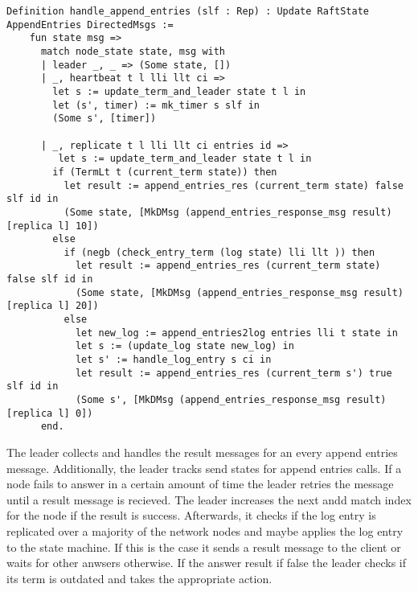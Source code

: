 \begin{lstlisting}[style=coq,label=lst:replicate,
caption=The definitions on how a node changes it node state.]
  Definition handle_append_entries (slf : Rep) : Update RaftState AppendEntries DirectedMsgs :=
    fun state msg =>
      match node_state state, msg with
      | leader _, _ => (Some state, [])
      | _, heartbeat t l lli llt ci =>
        let s := update_term_and_leader state t l in
        let (s', timer) := mk_timer s slf in
        (Some s', [timer])

      | _, replicate t l lli llt ci entries id =>
         let s := update_term_and_leader state t l in
        if (TermLt t (current_term state)) then
          let result := append_entries_res (current_term state) false slf id in
          (Some state, [MkDMsg (append_entries_response_msg result) [replica l] 10])
        else
          if (negb (check_entry_term (log state) lli llt )) then
            let result := append_entries_res (current_term state) false slf id in
            (Some state, [MkDMsg (append_entries_response_msg result) [replica l] 20])
          else
            let new_log := append_entries2log entries lli t state in
            let s := (update_log state new_log) in
            let s' := handle_log_entry s ci in
            let result := append_entries_res (current_term s') true slf id in
            (Some s', [MkDMsg (append_entries_response_msg result) [replica l] 0])
      end.
\end{lstlisting}

The leader collects and handles the result messages for an every append entries
message. Additionally, the leader tracks send states for append entries calls.
If a node fails to answer in a certain amount of time the leader retries
the message until a result message is recieved.
The leader increases the next andd match index for the node if the result is
success. Afterwards, it checks if the log entry is replicated over a majority
of the network nodes and maybe applies the log entry to the state machine.
If this is the case it sends a result message to the client or waits for
other anwsers otherwise.
If the answer result if false the leader checks if its term is outdated and
takes the appropriate action.

